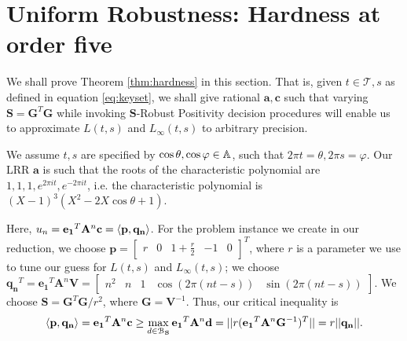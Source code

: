 \section{Uniform Robustness: Hardness at order five}
\label{section:hardness}
We shall prove Theorem \ref{thm:hardness} in this section. That is, given $t \in \mathcal{T}, s$ as defined in equation \ref{eq:keyset}, we shall give rational $\mathbf{a}, \mathbf{c}$ such that varying $\mathbf{S} =\mathbf{G}^T\mathbf{G}$ while invoking $\mathbf{S}$-Robust Positivity decision procedures will enable us to approximate $L(t, s)$ and $L_\infty(t, s)$ to arbitrary precision.

We assume $t, s$ are specified by $\cos \theta, \cos \varphi \in \mathbb{A}$, such that $2\pi t = \theta, 2\pi s = \varphi$. Our LRR $\mathbf{a}$ is such that the roots of the characteristic polynomial are $1, 1, 1, e^{2\pi it}, e^{-2\pi i t}$, i.e. the characteristic polynomial is 
$
(X- 1)^3(X^2 - 2X\cos\theta + 1)
$.

Here, 
$
u_n = \mathbf{e_1}^T\mathbf{A}^n\mathbf{c} = \langle\mathbf{p}, \mathbf{q_n}\rangle
$. For the problem instance we create in our reduction, we choose $\mathbf{p} = \begin{bmatrix}r & 0 & 1+\frac{r}{2} & -1 & 0 \end{bmatrix}^T$, where $r$ is a parameter we use to tune our guess for $L(t, s)$ and $L_\infty(t, s)$; we choose $\mathbf{q_n}^T = \mathbf{e_1}^T\mathbf{A}^n\mathbf{V} = \begin{bmatrix}n^2 & n & 1 & \cos(2\pi(nt-s)) & \sin(2\pi(nt-s))\end{bmatrix}$. We choose $\mathbf{S} = \mathbf{G}^T\mathbf{G}/r^2$, where $\mathbf{G} = \mathbf{V}^{-1}$. Thus, our critical inequality is
\begin{equation}
\label{eq:corereduction}
\langle\mathbf{p}, \mathbf{q_n}\rangle = \mathbf{e_1}^T\mathbf{A}^n\mathbf{c} \ge \max_{d \in \mathcal{B}_\mathbf{S}}  \mathbf{e_1}^T\mathbf{A}^n\mathbf{d} = ||r(\mathbf{e_1}^T\mathbf{A}^n\mathbf{G}^{-1})^T|| = r||\mathbf{q_n}||.
\end{equation}

